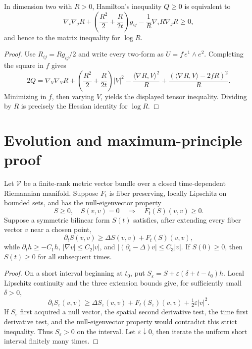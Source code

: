 \begin{proposition}
\label{prop:chow-ii-equivalent-surface-matrix-harnack-forms}
In dimension two with \(R>0\), Hamilton's inequality \(Q\ge0\) is equivalent
to
\[
\nabla_i\nabla_jR+\left(\frac{R^2}{2}+\frac{R}{2t}\right)g_{ij}
-\frac1R\nabla_iR\nabla_jR\ge0,
\]
and hence to the matrix inequality for \(\log R\).
\end{proposition}
\begin{proof}
\sketch Use \(R_{ij}=Rg_{ij}/2\) and write every two-form as
\(U=f\,e^1\wedge e^2\).  Completing the square in \(f\) gives
\[
2Q=\nabla_V\nabla_VR+\left(\frac{R^2}{2}+\frac{R}{2t}\right)|V|^2
-\frac{\langle\nabla R,V\rangle^2}{R}
+\frac{(\langle\nabla R,V\rangle-2fR)^2}{R}.
\]
Minimizing in \(f\), then varying \(V\), yields the displayed tensor
inequality.  Dividing by \(R\) is precisely the Hessian identity for
\(\log R\).
\end{proof}

\section{Evolution and maximum-principle proof}

\begin{proposition}
\label{prop:chow-ii-bilinear-form-maximum-principle}
Let \(\mathcal V\) be a finite-rank metric vector bundle over a closed
time-dependent Riemannian manifold.  Suppose \(F_t\) is fiber preserving,
locally Lipschitz on bounded sets, and has the null-eigenvector property
\[
S\ge0,\quad S(v,v)=0\quad\Longrightarrow\quad F_t(S)(v,v)\ge0.
\]
Suppose a symmetric bilinear form \(S(t)\) satisfies, after extending every
fiber vector \(v\) near a chosen point,
\[
\partial_tS(v,v)\ge\Delta S(v,v)+F_t(S)(v,v),
\]
while \(\partial_th\ge-C_1h\), \(|\nabla v|\le C_2|v|\), and
\(|(\partial_t-\Delta)v|\le C_3|v|\).  If \(S(0)\ge0\), then
\(S(t)\ge0\) for all subsequent times.
\end{proposition}
\begin{proof}
\sketch On a short interval beginning at \(t_0\), put
\(S_\varepsilon=S+\varepsilon(\delta+t-t_0)h\).  Local Lipschitz continuity
and the three extension bounds give, for sufficiently small \(\delta>0\),
\[
\partial_tS_\varepsilon(v,v)\ge\Delta S_\varepsilon(v,v)
+F_t(S_\varepsilon)(v,v)+\tfrac12\varepsilon|v|^2.
\]
If \(S_\varepsilon\) first acquired a null vector, the spatial second
derivative test, the time first derivative test, and the null-eigenvector
property would contradict this strict inequality.  Thus
\(S_\varepsilon>0\) on the interval.  Let \(\varepsilon\downarrow0\), then
iterate the uniform short interval finitely many times.
\end{proof}

